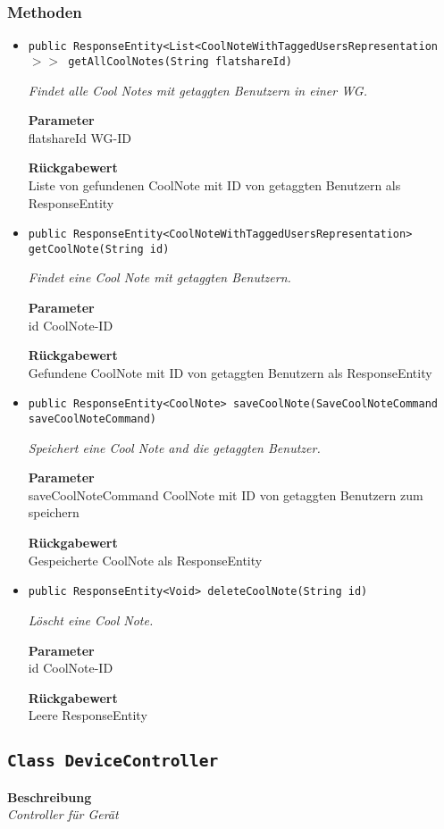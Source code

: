     \subsubsection{Methoden}
    \begin{itemize}
    	\item{\texttt{public ResponseEntity<List<CoolNoteWithTaggedUsersRepresentation$>>$ getAllCoolNotes(String flatshareId)}}
    	
    	\textit{Findet alle Cool Notes mit getaggten Benutzern in einer WG.}
    	
    	\textbf{Parameter} \\
    	flatshareId WG-ID
    	
    	\textbf{Rückgabewert} \\
    	Liste von gefundenen CoolNote mit ID von getaggten Benutzern als ResponseEntity        \item{\texttt{public ResponseEntity<CoolNoteWithTaggedUsersRepresentation> getCoolNote(String id)}}
    	
    	\textit{Findet eine Cool Note mit getaggten Benutzern.}
    	
    	\textbf{Parameter} \\
    	id CoolNote-ID
    	
    	\textbf{Rückgabewert} \\
    	Gefundene CoolNote mit ID von getaggten Benutzern als ResponseEntity        \item{\texttt{public ResponseEntity<CoolNote> saveCoolNote(SaveCoolNoteCommand saveCoolNoteCommand)}}
    	
    	\textit{Speichert eine Cool Note and die getaggten Benutzer.}
    	
    	\textbf{Parameter} \\
    	saveCoolNoteCommand CoolNote mit ID von getaggten Benutzern zum speichern
    	
    	\textbf{Rückgabewert} \\
    	Gespeicherte CoolNote als ResponseEntity        \item{\texttt{public ResponseEntity<Void> deleteCoolNote(String id)}}
    	
    	\textit{Löscht eine Cool Note.}
    	
    	\textbf{Parameter} \\
    	id CoolNote-ID
    	
    	\textbf{Rückgabewert} \\
    	Leere ResponseEntity
    \end{itemize}
    \subsection{\texttt{Class DeviceController}}
    \textbf{Beschreibung} \\
    \textit{Controller für Gerät}
